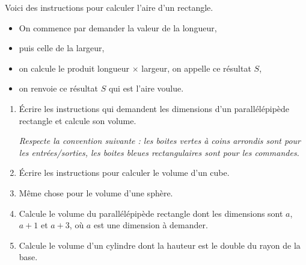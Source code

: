 \documentclass[class=report,crop=false,12pt]{standalone}
\begin{document}


\begin{activite}

Voici des instructions pour calculer l'aire d'un rectangle.

\vspace*{-1ex}


\vspace*{-1ex}

\begin{itemize}
  \item On commence par demander la valeur de la longueur,
  \item puis celle de la largeur,
  \item on calcule le produit longueur $\times$ largeur, on appelle ce résultat $S$,
  \item on renvoie ce résultat $S$ qui est l'aire voulue.
\end{itemize}

\begin{enumerate}
  \item Écrire les instructions qui demandent les dimensions d'un parallélépipède rectangle et calcule son volume.
  
  \emph{Respecte la convention suivante : les boites vertes à coins arrondis sont pour les entrées\slash sorties, les boites bleues rectangulaires sont pour les commandes.}
  
  \item Écrire les instructions pour calculer le volume d'un cube. %
  
  \item Même chose pour le volume d'une sphère.
    
  \item Calcule le volume du parallélépipède rectangle dont les dimensions sont $a$, $a+1$ et $a+3$, où $a$ est une dimension à demander.  
  
  \item Calcule le volume d'un cylindre dont la hauteur est le double du rayon de la base.  
  
\end{enumerate}

\vspace*{-2ex}
\end{activite}
\end{document}
